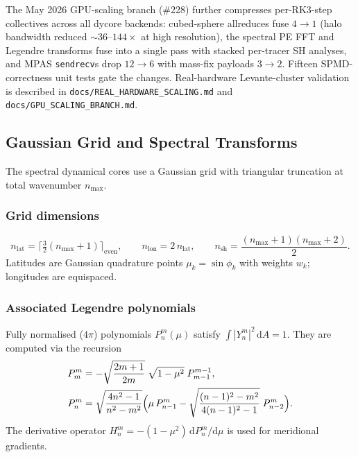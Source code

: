 \documentclass[11pt,a4paper]{article}
\newcommand{\dd}{\mathrm{d}}
\begin{document}
The May 2026 GPU-scaling branch (\#228) further compresses per-RK3-step
collectives across all dycore backends: cubed-sphere allreduces fuse
$4\to 1$ (halo bandwidth reduced ${\sim}36\text{--}144\times$ at
high resolution), the spectral PE FFT and Legendre transforms fuse
into a single pass with stacked per-tracer SH analyses, and MPAS
\texttt{sendrecv}s drop $12\to 6$ with mass-fix payloads $3\to 2$.
Fifteen SPMD-correctness unit tests gate the changes.  Real-hardware
Levante-cluster validation is described in
\texttt{docs/REAL\_HARDWARE\_SCALING.md} and
\texttt{docs/GPU\_SCALING\_BRANCH.md}.

\subsection{Gaussian Grid and Spectral Transforms}

The spectral dynamical cores use a Gaussian grid with triangular truncation at total wavenumber $n_{\max}$.

\subsubsection{Grid dimensions}
\begin{equation}
  n_{\mathrm{lat}} = \lceil\tfrac{3}{2}(n_{\max}+1)\rceil_{\mathrm{even}},
  \qquad n_{\mathrm{lon}} = 2\,n_{\mathrm{lat}},
  \qquad n_{\mathrm{sh}} = \frac{(n_{\max}+1)(n_{\max}+2)}{2}.
\end{equation}
Latitudes are Gaussian quadrature points $\mu_k=\sin\phi_k$ with weights $w_k$; longitudes are equispaced.

\subsubsection{Associated Legendre polynomials}
Fully normalised ($4\pi$) polynomials $P_n^m(\mu)$ satisfy $\int|Y_n^m|^2\,\dd A=1$.  They are computed via the recursion
\begin{align}
  P_m^m &= -\sqrt{\frac{2m+1}{2m}}\;\sqrt{1-\mu^2}\;P_{m-1}^{m-1},\\
  P_n^m &= \sqrt{\frac{4n^2-1}{n^2-m^2}}\Bigl(\mu\,P_{n-1}^m - \sqrt{\frac{(n-1)^2-m^2}{4(n-1)^2-1}}\;P_{n-2}^m\Bigr).
\end{align}
The derivative operator $H_n^m=-(1-\mu^2)\,\dd P_n^m/\dd\mu$ is used for meridional gradients.
\end{document}
